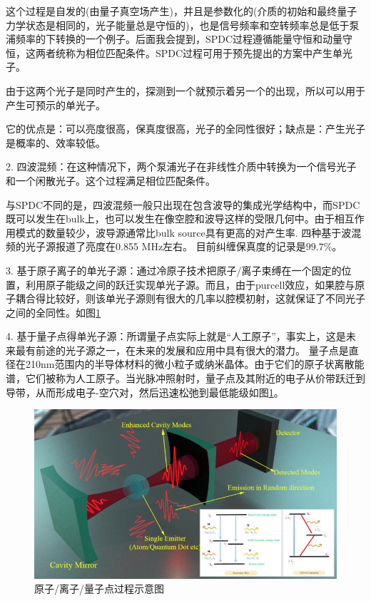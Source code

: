 这个过程是自发的(由量子真空场产生)，并且是参数化的(介质的初始和最终量子力学状态是相同的，光子能量总是守恒的)，也是信号频率和空转频率总是低于泵浦频率的下转换的一个例子。后面我会提到，SPDC过程遵循能量守恒和动量守恒，这两者统称为相位匹配条件。SPDC过程可用于预先提出的方案中产生单光子。

由于这两个光子是同时产生的，探测到一个就预示着另一个的出现，所以可以用于产生可预示的单光子。

它的优点是：可以亮度很高，保真度很高，光子的全同性很好；缺点是：产生光子是概率的、效率较低。

2.  四波混频：在这种情况下，两个泵浦光子在非线性介质中转换为一个信号光子和一个闲散光子。这个过程满足相位匹配条件。

与SPDC不同的是，四波混频一般只出现在包含波导的集成光学结构中，而SPDC既可以发生在bulk上，也可以发生在像空腔和波导这样的受限几何中。由于相互作用模式的数量较少，波导源通常比bulk source具有更高的对产生率. 四种基于波混频的光子源报道了亮度在0.855 MHz左右。
目前纠缠保真度的记录是$99.7\%$。

3.  基于原子离子的单光子源：通过冷原子技术把原子/离子束缚在一个固定的位置，利用原子能级之间的跃迁实现单光子源。而且，由于purcell效应，如果腔与原子耦合得比较好，则该单光子源则有很大的几率以腔模初射，这就保证了不同光子之间的全同性。如图\ref{fig:qdot}

4.  基于量子点得单光子源：所谓量子点实际上就是“人工原子”，事实上，这是未来最有前途的光子源之一，在未来的发展和应用中具有很大的潜力。
量子点是直径在210nm范围内的半导体材料的微小粒子或纳米晶体。由于它们的原子状离散能谱，它们被称为人工原子。当光脉冲照射时，量子点及其附近的电子从价带跃迁到导带，从而形成电子-空穴对，然后迅速松弛到最低能级如图\ref{fig:qdot}。

\begin{figure}[ht]
	\centering
	\includegraphics[scale=0.2]{pic/qdot}
	\caption{原子/离子/量子点过程示意图}
	\label{fig:qdot}
\end{figure}

